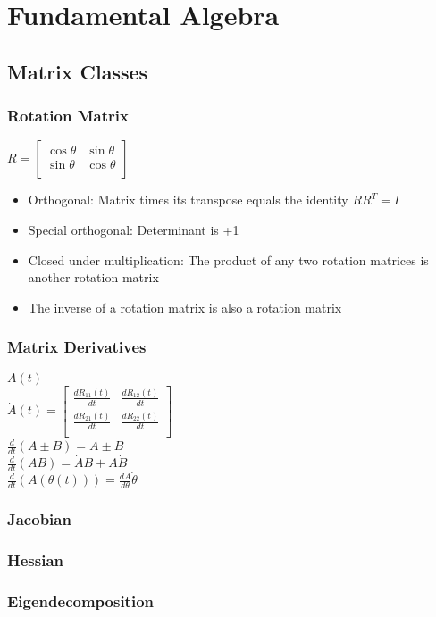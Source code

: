 \section{Fundamental Algebra}

\subsection{Matrix Classes}

\subsubsection{Rotation Matrix}

$R=\begin{bmatrix} \cos \theta & \sin \theta \\ \sin \theta & \cos \theta \\ \end{bmatrix}$

\begin{itemize}
\item Orthogonal: Matrix times its transpose equals the identity $RR^T=I$
\item Special orthogonal: Determinant is +1
\item Closed under multiplication: The product of any two rotation matrices is another rotation matrix
\item The inverse of a rotation matrix is also a rotation matrix
\end{itemize}

\subsubsection{Matrix Derivatives}
$A(t)$
\\

$\dot{A}(t) = \begin{bmatrix}
\frac{dR_{11}(t)}{dt} & \frac{dR_{12}(t)}{dt} \\
\frac{dR_{21}(t)}{dt} & \frac{dR_{22}(t)}{dt} \\
\end{bmatrix} $
\\

$\frac{d}{dt}(A \pm B) = \dot{A} \pm \dot{B}$
\\

$\frac{d}{dt} (AB) = \dot{A} B + A \dot {B}$
\\

$\frac{d}{dt}(A(\theta(t))) = \frac{dA}{d\theta}\dot{\theta}$

\subsubsection{Jacobian}

\subsubsection{Hessian}


\subsubsection{Eigendecomposition}
